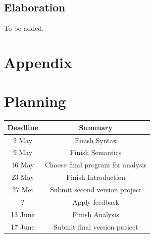 \documentclass{article}
\begin{document}
\subsection{Elaboration}
To be added. %
\newpage
\section*{Appendix}
\appendix
\section{Planning}
\begin{tabular}{|c|c|}
\hline
 Deadline   &  Summary \\
 \hline
   2 May & Finish Syntax\\
   9 May & Finish Semantics\\
   16 May & Choose final program for analysis\\
      23 May & Finish Introduction\\
    27 Mei & Submit second version project \\
    ? & Apply feedback \\
    13 June & Finish Analysis\\
    17 June & Submit final version project \\
    \hline
\end{tabular}

\end{document}
